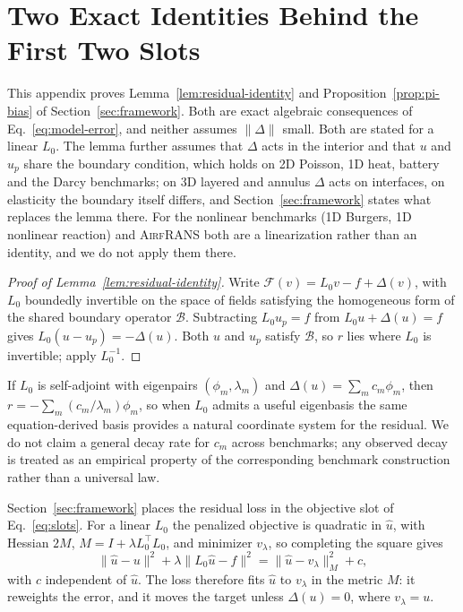 \documentclass{article}
\begin{document}



\newpage
\appendix

\section{Two Exact Identities Behind the First Two Slots}
\label{app:identities}

This appendix proves Lemma~\ref{lem:residual-identity} and
Proposition~\ref{prop:pi-bias} of Section~\ref{sec:framework}. Both are exact algebraic
consequences of Eq.~\ref{eq:model-error}, and neither assumes $\|\Delta\|$ small. Both are
stated for a linear $L_0$. The lemma further assumes that $\Delta$ acts in the interior and
that $u$ and $u_p$ share the boundary condition, which holds on 2D Poisson, 1D heat, battery
and the Darcy benchmarks; on 3D layered and annulus $\Delta$ acts on interfaces, on
elasticity the boundary itself differs, and Section~\ref{sec:framework} states what replaces the
lemma there. For the nonlinear benchmarks (1D Burgers, 1D nonlinear reaction) and
\textsc{AirfRANS} both are a linearization rather than an identity, and we do not apply them
there.

\begin{proof}[Proof of Lemma~\ref{lem:residual-identity}]
Write $\mathcal{F}(v)=L_0v-f+\Delta(v)$, with $L_0$ boundedly invertible on the space of
fields satisfying the homogeneous form of the shared boundary operator $\mathcal{B}$.
Subtracting $L_0u_p=f$ from $L_0u+\Delta(u)=f$ gives $L_0(u-u_p)=-\Delta(u)$. Both $u$ and
$u_p$ satisfy $\mathcal{B}$, so $r$ lies where $L_0$ is invertible; apply $L_0^{-1}$.
\end{proof}

\noindent
If $L_0$ is self-adjoint with eigenpairs $(\phi_m,\lambda_m)$ and
$\Delta(u)=\sum_m c_m\phi_m$, then $r=-\sum_m(c_m/\lambda_m)\phi_m$, so when $L_0$ admits a
useful eigenbasis the same equation-derived basis provides a natural coordinate system for
the residual. We do not claim a general decay rate for $c_m$ across benchmarks; any observed
decay is treated as an empirical property of the corresponding benchmark construction rather
than a universal law.

Section~\ref{sec:framework} places the residual loss in the objective slot of
Eq.~\ref{eq:slots}. For a linear $L_0$ the penalized objective is quadratic in $\hat u$, with
Hessian $2M$, $M=I+\lambda L_0^{\!\top}L_0$, and minimizer $v_\lambda$, so completing the
square gives
\begin{equation}
  \|\hat u-u\|^{2}+\lambda\|L_0\hat u-f\|^{2}
  =
  \|\hat u-v_\lambda\|_{M}^{2}+c,
  \label{eq:metric-shift}
\end{equation}
with $c$ independent of $\hat u$. The loss therefore fits $\hat u$ to $v_\lambda$ in the
metric $M$: it reweights the error, and it moves the target unless $\Delta(u)=0$, where
$v_\lambda=u$.
\end{document}
